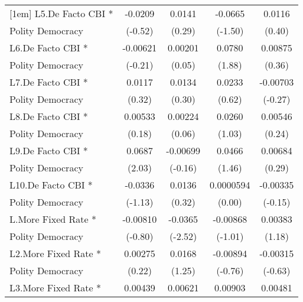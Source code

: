 {\begin{tabular}{l*{4}{c}}
[1em]
L5.De Facto CBI *   &     -0.0209         &      0.0141         &     -0.0665         &      0.0116         \\
Polity Democracy    &     (-0.52)         &      (0.29)         &     (-1.50)         &      (0.40)         \\
[1em]
L6.De Facto CBI *   &    -0.00621         &     0.00201         &      0.0780         &     0.00875         \\
Polity Democracy    &     (-0.21)         &      (0.05)         &      (1.88)         &      (0.36)         \\
[1em]
L7.De Facto CBI *   &      0.0117         &      0.0134         &      0.0233         &    -0.00703         \\
Polity Democracy    &      (0.32)         &      (0.30)         &      (0.62)         &     (-0.27)         \\
[1em]
L8.De Facto CBI *   &     0.00533         &     0.00224         &      0.0260         &     0.00546         \\
Polity Democracy    &      (0.18)         &      (0.06)         &      (1.03)         &      (0.24)         \\
[1em]
L9.De Facto CBI *   &      0.0687\sym{*}  &    -0.00699         &      0.0466         &     0.00684         \\
Polity Democracy    &      (2.03)         &     (-0.16)         &      (1.46)         &      (0.29)         \\
[1em]
L10.De Facto CBI *  &     -0.0336         &      0.0136         &   0.0000594         &    -0.00335         \\
Polity Democracy    &     (-1.13)         &      (0.32)         &      (0.00)         &     (-0.15)         \\
[1em]
L.More Fixed Rate * &    -0.00810         &     -0.0365\sym{*}  &    -0.00868         &     0.00383         \\
Polity Democracy    &     (-0.80)         &     (-2.52)         &     (-1.01)         &      (1.18)         \\
[1em]
L2.More Fixed Rate *&     0.00275         &      0.0168         &    -0.00894         &    -0.00315         \\
Polity Democracy    &      (0.22)         &      (1.25)         &     (-0.76)         &     (-0.63)         \\
[1em]
L3.More Fixed Rate *&     0.00439         &     0.00621         &     0.00903         &     0.00481         \\

\end{tabular}}
